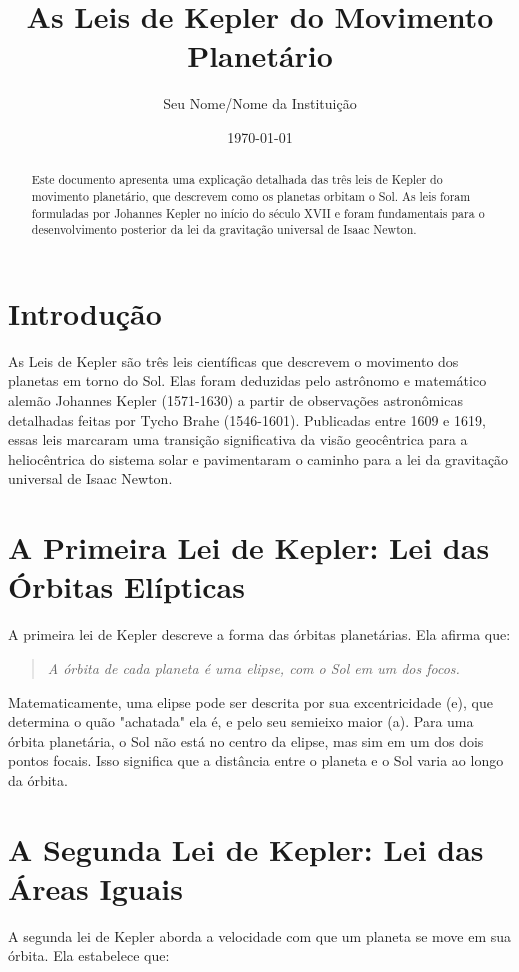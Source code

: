 \documentclass{article}
\title{As Leis de Kepler do Movimento Planetário}
\author{Seu Nome/Nome da Instituição}
\date{\today}
\begin{document}
\maketitle

\begin{abstract}
Este documento apresenta uma explicação detalhada das três leis de Kepler do movimento planetário, que descrevem como os planetas orbitam o Sol. As leis foram formuladas por Johannes Kepler no início do século XVII e foram fundamentais para o desenvolvimento posterior da lei da gravitação universal de Isaac Newton.
\end{abstract}

\section{Introdução}
As Leis de Kepler são três leis científicas que descrevem o movimento dos planetas em torno do Sol. Elas foram deduzidas pelo astrônomo e matemático alemão Johannes Kepler (1571-1630) a partir de observações astronômicas detalhadas feitas por Tycho Brahe (1546-1601). Publicadas entre 1609 e 1619, essas leis marcaram uma transição significativa da visão geocêntrica para a heliocêntrica do sistema solar e pavimentaram o caminho para a lei da gravitação universal de Isaac Newton.

\section{A Primeira Lei de Kepler: Lei das Órbitas Elípticas}
A primeira lei de Kepler descreve a forma das órbitas planetárias. Ela afirma que:

\begin{quote}
\textit{A órbita de cada planeta é uma elipse, com o Sol em um dos focos.}
\end{quote}

Matematicamente, uma elipse pode ser descrita por sua excentricidade (e), que determina o quão "achatada" ela é, e pelo seu semieixo maior (a). Para uma órbita planetária, o Sol não está no centro da elipse, mas sim em um dos dois pontos focais. Isso significa que a distância entre o planeta e o Sol varia ao longo da órbita.

\section{A Segunda Lei de Kepler: Lei das Áreas Iguais}
A segunda lei de Kepler aborda a velocidade com que um planeta se move em sua órbita. Ela estabelece que:
\end{document}
